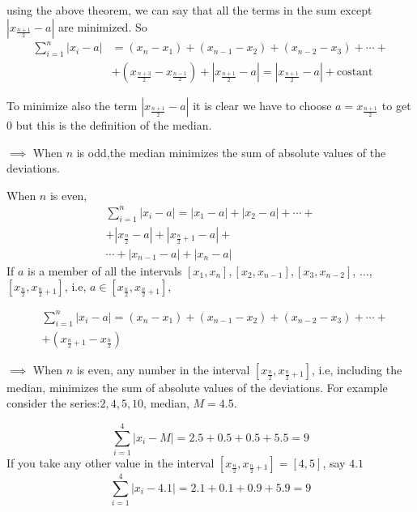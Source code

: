 using the above theorem, we can say that all the terms in the sum except $\left|x_{\tfrac{n+1}{2}}-a\right|$ are minimized. So
\begin{equation}
\begin{aligned}
\sum_{i=1}^n|x_i-a|&=(x_n-x_1)+(x_{n-1}-x_2)+(x_{n-2}-x_3)+\cdots +\\
& +\left(x_{\tfrac{n+3}{2}}-x_{\tfrac{n-1}{2}}\right) + \left|x_{\tfrac{n+1}{2}}-a\right| = \left|x_{\tfrac{n+1}{2}}-a \right|+\text{costant}
\end{aligned}
\end{equation}

To minimize also the term $\left|x_{\tfrac{n+1}{2}}-a \right|$ it is clear we have to choose $a=x_{\tfrac{n+1}{2}}$ to get $0$ but this is the definition of the median.

$\implies$ When $n$ is odd,the median minimizes the sum of absolute values of the deviations.

When $n$ is even,
\begin{equation}
\begin{aligned}
\sum_{i=1}^n|x_i-a|=|x_1-a|+|x_2-a|+\cdots+\\
+|x_{\tfrac{n}{2}}-a|+|x_{\tfrac{n}{2}+1}-a|+\\
 \cdots+|x_{n-1}-a|+|x_n-a|
\end{aligned}
\end{equation}
If $a$ is a member of all the intervals $[x_1,x_n], [x_2,x_{n-1}], [x_3,x_{n-2}]$, $\ldots$, $\left[x_{\tfrac{n}{2}},x_{\tfrac{n}{2}+1}\right]$, i.e, $a\in\left[x_{\tfrac{n}{2}},x_{\tfrac{n}{2}+1}\right]$,

\begin{equation}
\begin{aligned}
&\sum_{i=1}^n|x_i-a|=(x_n-x_1)+(x_{n-1}-x_2)+(x_{n-2}-x_3)+\cdots + \\
&+\left(x_{\tfrac{n}{2}+1}-x_{\tfrac{n}{2}}\right)
\end{aligned}
\end{equation}

$\implies$ When $n$ is even, any number in the interval $[x_{\tfrac{n}{2}},x_{\tfrac{n}{2}+1}]$, i.e, including the median, minimizes the sum of absolute values of the deviations. For example consider the series:$2, 4, 5, 10$, median, $M=4.5$.

$$
\sum_{i=1}^4|x_i-M|=2.5+0.5+0.5+5.5=9
$$
If you take any other value in the interval $\left[x_{\tfrac{n}{2}},x_{\tfrac{n}{2} + 1} \right] =[4,5]$, say $4.1$
$$
\sum_{i=1}^4|x_i-4.1|=2.1+0.1+0.9+5.9=9
$$

